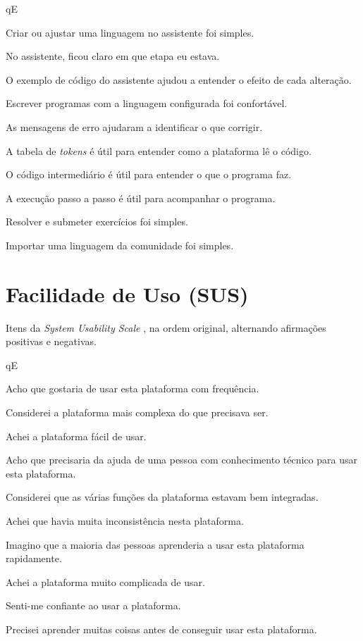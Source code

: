 \begin{questoes}{qE}
    \item\label{qE:recursos-ini} Criar ou ajustar uma linguagem no assistente foi simples.
    \item No assistente, ficou claro em que etapa eu estava.
    \item O exemplo de código do assistente ajudou a entender o efeito de cada alteração.
    \item Escrever programas com a linguagem configurada foi confortável.
    \item\label{qE:msg-recursos} As mensagens de erro ajudaram a identificar o que corrigir.
    \item\label{qE:fases-ini} A tabela de \textit{tokens} é útil para entender como a plataforma lê o código.
    \item O código intermediário é útil para entender o que o programa faz.
    \item\label{qE:fases-fim} A execução passo a passo é útil para acompanhar o programa.
    \item Resolver e submeter exercícios foi simples.
    \item\label{qE:recursos-fim} Importar uma linguagem da comunidade foi simples.
\end{questoes}


\section{Facilidade de Uso (SUS)}

Itens da \textit{System Usability Scale} \cite{brooke1996}, na ordem original, alternando afirmações positivas e negativas.


\begin{questoes}{qE}
    \item\label{qE:sus-ini} Acho que gostaria de usar esta plataforma com frequência.
    \item Considerei a plataforma mais complexa do que precisava ser.
    \item Achei a plataforma fácil de usar.
    \item Acho que precisaria da ajuda de uma pessoa com conhecimento técnico para usar esta plataforma.
    \item Considerei que as várias funções da plataforma estavam bem integradas.
    \item Achei que havia muita inconsistência nesta plataforma.
    \item Imagino que a maioria das pessoas aprenderia a usar esta plataforma rapidamente.
    \item Achei a plataforma muito complicada de usar.
    \item Senti-me confiante ao usar a plataforma.
    \item\label{qE:sus-fim} Precisei aprender muitas coisas antes de conseguir usar esta plataforma.
\end{questoes}


